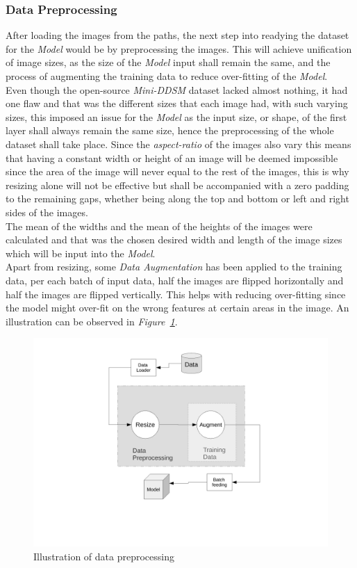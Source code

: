 \documentclass[12pt]{extarticle}
\begin{document}
	\subsubsection{Data Preprocessing}\label{preproc}
	After loading the images from the paths, the next step into readying the dataset for the \emph{Model} would be by preprocessing the images. This will achieve unification of image sizes, as the size of the \emph{Model} input shall remain the same, and the process of augmenting the training data to reduce over-fitting of the \emph{Model}.\\
	Even though the open-source \emph{Mini-DDSM} dataset lacked almost nothing, it had one flaw and that was the different sizes that each image had, with such varying sizes, this imposed an issue for the \emph{Model} as the input size, or shape, of the first layer shall always remain the same size, hence the preprocessing of the whole dataset shall take place. Since the \emph{aspect-ratio} of the images also vary this means that having a constant width or height of an image will be deemed impossible since the area of the image will never equal to the rest of the images, this is why resizing alone will not be effective but shall be accompanied with a zero padding to the remaining gaps, whether being along the top and bottom or left and right sides of the images.\\
	The mean of the widths and the mean of the heights of the images were calculated and that was the chosen desired width and length of the image sizes which will be input into the \emph{Model}.\\
	Apart from resizing, some \emph{Data Augmentation} has been applied to the training data, per each batch of input data, half the images are flipped horizontally and half the images are flipped vertically. This helps with reducing over-fitting since the model might over-fit on the wrong features at certain areas in the image. An illustration can be observed in \emph{Figure~\ref{fig:Data_preproc}}.
	\begin{figure}[h]
		\centering
		\includegraphics[width=1\textwidth]{pics/Figures/Data_preproc.pdf}
		\caption{\small{Illustration of data preprocessing}}
		\label{fig:Data_preproc}
	\end{figure}
	
\end{document}
